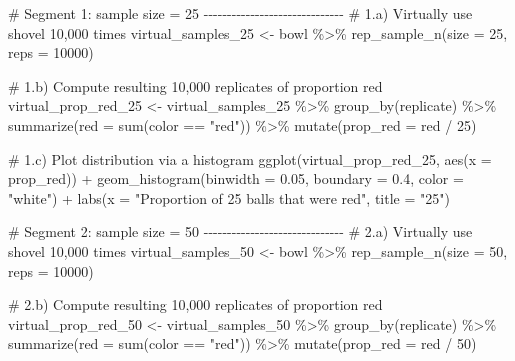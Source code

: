 \documentclass[
  letterpaper,
  DIV=11,
  numbers=noendperiod]{scrreprt}
\newenvironment{Shaded}{\begin{snugshade}}{\end{snugshade}}
\newcommand{\AttributeTok}[1]{\textcolor[rgb]{0.40,0.45,0.13}{#1}}
\newcommand{\CommentTok}[1]{\textcolor[rgb]{0.37,0.37,0.37}{#1}}
\newcommand{\DecValTok}[1]{\textcolor[rgb]{0.68,0.00,0.00}{#1}}
\newcommand{\FloatTok}[1]{\textcolor[rgb]{0.68,0.00,0.00}{#1}}
\newcommand{\FunctionTok}[1]{\textcolor[rgb]{0.28,0.35,0.67}{#1}}
\newcommand{\NormalTok}[1]{\textcolor[rgb]{0.00,0.23,0.31}{#1}}
\newcommand{\OtherTok}[1]{\textcolor[rgb]{0.00,0.23,0.31}{#1}}
\newcommand{\SpecialCharTok}[1]{\textcolor[rgb]{0.37,0.37,0.37}{#1}}
\newcommand{\StringTok}[1]{\textcolor[rgb]{0.13,0.47,0.30}{#1}}
\theoremstyle{definition}
\theoremstyle{remark}
\begin{document}
\begin{Shaded}
\begin{Highlighting}[]
\CommentTok{\# Segment 1: sample size = 25 {-}{-}{-}{-}{-}{-}{-}{-}{-}{-}{-}{-}{-}{-}{-}{-}{-}{-}{-}{-}{-}{-}{-}{-}{-}{-}{-}{-}{-}{-}}
\CommentTok{\# 1.a) Virtually use shovel 10,000 times}
\NormalTok{virtual\_samples\_25 }\OtherTok{\textless{}{-}}\NormalTok{ bowl }\SpecialCharTok{\%\textgreater{}\%} 
  \FunctionTok{rep\_sample\_n}\NormalTok{(}\AttributeTok{size =} \DecValTok{25}\NormalTok{, }\AttributeTok{reps =} \DecValTok{10000}\NormalTok{)}

\CommentTok{\# 1.b) Compute resulting 10,000 replicates of proportion red}
\NormalTok{virtual\_prop\_red\_25 }\OtherTok{\textless{}{-}}\NormalTok{ virtual\_samples\_25 }\SpecialCharTok{\%\textgreater{}\%} 
  \FunctionTok{group\_by}\NormalTok{(replicate) }\SpecialCharTok{\%\textgreater{}\%} 
  \FunctionTok{summarize}\NormalTok{(}\AttributeTok{red =} \FunctionTok{sum}\NormalTok{(color }\SpecialCharTok{==} \StringTok{"red"}\NormalTok{)) }\SpecialCharTok{\%\textgreater{}\%} 
  \FunctionTok{mutate}\NormalTok{(}\AttributeTok{prop\_red =}\NormalTok{ red }\SpecialCharTok{/} \DecValTok{25}\NormalTok{)}

\CommentTok{\# 1.c) Plot distribution via a histogram}
\FunctionTok{ggplot}\NormalTok{(virtual\_prop\_red\_25, }\FunctionTok{aes}\NormalTok{(}\AttributeTok{x =}\NormalTok{ prop\_red)) }\SpecialCharTok{+}
  \FunctionTok{geom\_histogram}\NormalTok{(}\AttributeTok{binwidth =} \FloatTok{0.05}\NormalTok{, }\AttributeTok{boundary =} \FloatTok{0.4}\NormalTok{, }\AttributeTok{color =} \StringTok{"white"}\NormalTok{) }\SpecialCharTok{+}
  \FunctionTok{labs}\NormalTok{(}\AttributeTok{x =} \StringTok{"Proportion of 25 balls that were red"}\NormalTok{, }\AttributeTok{title =} \StringTok{"25"}\NormalTok{) }

\CommentTok{\# Segment 2: sample size = 50 {-}{-}{-}{-}{-}{-}{-}{-}{-}{-}{-}{-}{-}{-}{-}{-}{-}{-}{-}{-}{-}{-}{-}{-}{-}{-}{-}{-}{-}{-}}
\CommentTok{\# 2.a) Virtually use shovel 10,000 times}
\NormalTok{virtual\_samples\_50 }\OtherTok{\textless{}{-}}\NormalTok{ bowl }\SpecialCharTok{\%\textgreater{}\%} 
  \FunctionTok{rep\_sample\_n}\NormalTok{(}\AttributeTok{size =} \DecValTok{50}\NormalTok{, }\AttributeTok{reps =} \DecValTok{10000}\NormalTok{)}

\CommentTok{\# 2.b) Compute resulting 10,000 replicates of proportion red}
\NormalTok{virtual\_prop\_red\_50 }\OtherTok{\textless{}{-}}\NormalTok{ virtual\_samples\_50 }\SpecialCharTok{\%\textgreater{}\%} 
  \FunctionTok{group\_by}\NormalTok{(replicate) }\SpecialCharTok{\%\textgreater{}\%} 
  \FunctionTok{summarize}\NormalTok{(}\AttributeTok{red =} \FunctionTok{sum}\NormalTok{(color }\SpecialCharTok{==} \StringTok{"red"}\NormalTok{)) }\SpecialCharTok{\%\textgreater{}\%} 
  \FunctionTok{mutate}\NormalTok{(}\AttributeTok{prop\_red =}\NormalTok{ red }\SpecialCharTok{/} \DecValTok{50}\NormalTok{)}


\end{Highlighting}
\end{Shaded}
\end{document}
